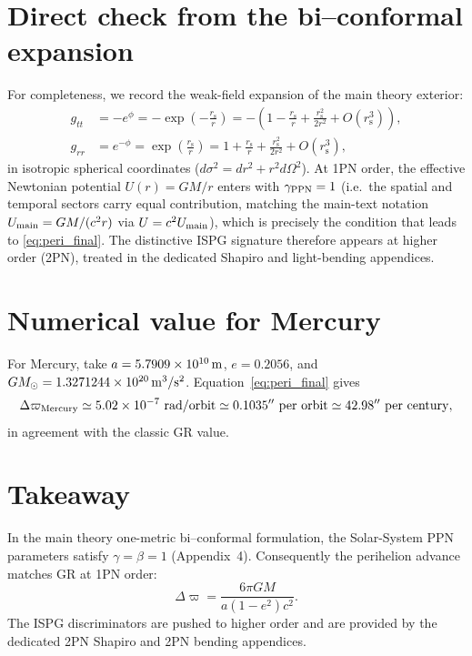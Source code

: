 \documentclass[11pt]{article}
\newcommand{\rs}{r_{\mathrm{s}}}
\begin{document}
\section{Direct check from the bi--conformal expansion}\label{sec:direct}
For completeness, we record the weak-field expansion of the main theory exterior:
\begin{align}
g_{tt}&=-e^{\phi}=-\exp\!\left(-\frac{\rs}{r}\right)
= -\left(1-\frac{\rs}{r}+\frac{\rs^2}{2r^2}+O(\rs^3)\right),\\
g_{rr}&=e^{-\phi}=\exp\!\left(\frac{\rs}{r}\right)
= 1+\frac{\rs}{r}+\frac{\rs^2}{2r^2}+O(\rs^3),
\end{align}
in isotropic spherical coordinates ($d\sigma^2=dr^2+r^2d\Omega^2$). At 1PN order, the effective Newtonian potential $U(r)=GM/r$ enters with $\gamma_{\rm PPN}=1$ (i.e.\ the spatial and temporal sectors carry equal contribution, matching the main-text notation $U_{\rm main} = GM/(c^2 r)$ via $U = c^2 U_{\rm main}$), which is precisely the condition that leads to \eqref{eq:peri_final}. The distinctive ISPG signature therefore appears at higher order (2PN), treated in the dedicated Shapiro and light-bending appendices.

\section{Numerical value for Mercury}\label{sec:mercury}
For Mercury, take $a=5.7909\times 10^{10}\,{\rm m}$, $e=0.2056$, and $GM_\odot=1.3271244\times 10^{20}\,{\rm m^3/s^2}$. Equation~\eqref{eq:peri_final} gives
\begin{equation}
\Delta\varpi_{\rm Mercury}\simeq 5.02\times 10^{-7}\ {\rm rad/orbit}
\simeq 0.1035^{\prime\prime}\ {\rm per\ orbit}
\simeq 42.98^{\prime\prime}\ {\rm per\ century},
\end{equation}
in agreement with the classic GR value.

\section*{Takeaway}
In the main theory one-metric bi--conformal formulation, the Solar-System PPN parameters satisfy $\gamma=\beta=1$ (Appendix~4). Consequently the perihelion advance matches GR at 1PN order:
\[
\Delta\varpi=\frac{6\pi GM}{a(1-e^2)c^2}.
\]
The ISPG discriminators are pushed to higher order and are provided by the dedicated 2PN Shapiro and 2PN bending appendices.
\end{document}
